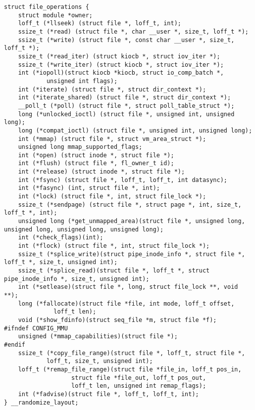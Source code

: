 
\begin{lstlisting}
struct file_operations {
	struct module *owner;
	loff_t (*llseek) (struct file *, loff_t, int);
	ssize_t (*read) (struct file *, char __user *, size_t, loff_t *);
	ssize_t (*write) (struct file *, const char __user *, size_t, loff_t *);
	ssize_t (*read_iter) (struct kiocb *, struct iov_iter *);
	ssize_t (*write_iter) (struct kiocb *, struct iov_iter *);
	int (*iopoll)(struct kiocb *kiocb, struct io_comp_batch *,
			unsigned int flags);
	int (*iterate) (struct file *, struct dir_context *);
	int (*iterate_shared) (struct file *, struct dir_context *);
	__poll_t (*poll) (struct file *, struct poll_table_struct *);
	long (*unlocked_ioctl) (struct file *, unsigned int, unsigned long);
	long (*compat_ioctl) (struct file *, unsigned int, unsigned long);
	int (*mmap) (struct file *, struct vm_area_struct *);
	unsigned long mmap_supported_flags;
	int (*open) (struct inode *, struct file *);
	int (*flush) (struct file *, fl_owner_t id);
	int (*release) (struct inode *, struct file *);
	int (*fsync) (struct file *, loff_t, loff_t, int datasync);
	int (*fasync) (int, struct file *, int);
	int (*lock) (struct file *, int, struct file_lock *);
	ssize_t (*sendpage) (struct file *, struct page *, int, size_t, loff_t *, int);
	unsigned long (*get_unmapped_area)(struct file *, unsigned long, unsigned long, unsigned long, unsigned long);
	int (*check_flags)(int);
	int (*flock) (struct file *, int, struct file_lock *);
	ssize_t (*splice_write)(struct pipe_inode_info *, struct file *, loff_t *, size_t, unsigned int);
	ssize_t (*splice_read)(struct file *, loff_t *, struct pipe_inode_info *, size_t, unsigned int);
	int (*setlease)(struct file *, long, struct file_lock **, void **);
	long (*fallocate)(struct file *file, int mode, loff_t offset,
			  loff_t len);
	void (*show_fdinfo)(struct seq_file *m, struct file *f);
#ifndef CONFIG_MMU
	unsigned (*mmap_capabilities)(struct file *);
#endif
	ssize_t (*copy_file_range)(struct file *, loff_t, struct file *,
			loff_t, size_t, unsigned int);
	loff_t (*remap_file_range)(struct file *file_in, loff_t pos_in,
				   struct file *file_out, loff_t pos_out,
				   loff_t len, unsigned int remap_flags);
	int (*fadvise)(struct file *, loff_t, loff_t, int);
} __randomize_layout;
\end{lstlisting}
